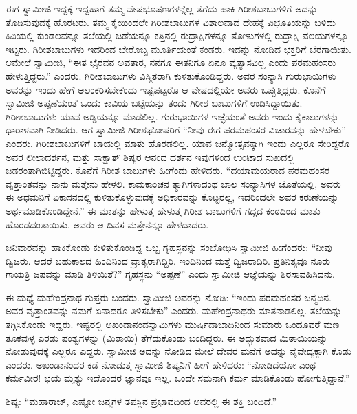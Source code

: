  ಈಗ ಸ್ವಾಮೀಜಿ ಇದ್ದಕ್ಕೆ ಇದ್ದಹಾಗೆ ತಮ್ಮ ವೇಷಭೂಷಣಗಳನ್ನೆಲ್ಲ ತೆಗೆದು ಹಾಕಿ ಗಿರೀಶಬಾಬುಗಳಿಗೆ ಅದನ್ನು ತೊಡಿಸುವುದಕ್ಕೆ ಹೊರಟರು. ತಮ್ಮ ಕೈಯಿಂದಲೇ ಗಿರೀಶಬಾಬುಗಳ ವಿಶಾಲವಾದ ದೇಹಕ್ಕೆ ವಿಭೂತಿಯನ್ನು ಬಳಿದು ಕಿವಿಯಲ್ಲಿ ಕುಂಡಲವನ್ನೂ ತಲೆಯಲ್ಲಿ ಜಡೆಯನ್ನೂ ಕತ್ತಿನಲ್ಲಿ ರುದ್ರಾಕ್ಷಿಗಳನ್ನೂ ತೋಳುಗಳಲ್ಲಿ ರುದ್ರಾಕ್ಷಿ ವಲಯಗಳನ್ನೂ ಇಟ್ಟರು. ಗಿರೀಶಬಾಬುಗಳು ಇದರಿಂದ ಬೇರೊಬ್ಬ ಮೂರ್ತಿಯಂತೆ ಕಂಡರು. ಇದನ್ನು ನೋಡಿದ ಭಕ್ತರಿಗೆ ಬೆರಗಾಯಿತು. ಆಮೇಲೆ ಸ್ವಾಮೀಜಿ, “ಈತ ಭೈರವನ ಅವತಾರ, ನನಗೂ ಈತನಿಗೂ ಏನೂ ವ್ಯತ್ಯಾಸವಿಲ್ಲ ಎಂದು ಪರಮಹಂಸರು ಹೇಳುತ್ತಿದ್ದರು.” ಎಂದರು. ಗಿರೀಶಬಾಬುಗಳು ವಿಸ್ಮಿತರಾಗಿ ಕುಳಿತುಕೊಂಡಿದ್ದರು. ಅವರ ಸಂನ್ಯಾಸಿ ಗುರುಭಾಯಿಗಳು ಅವರನ್ನು ಇಂದು ಹೇಗೆ ಅಲಂಕರಿಸಬೇಕೆಂದು ಇಷ್ಟಪಟ್ಟರೊ ಆ ವೇಷದಲ್ಲಿಯೇ ಅವರು ಒಪ್ಪುತ್ತಿದ್ದರು. ಕೊನೆಗೆ ಸ್ವಾಮೀಜಿ ಅಪ್ಪಣೆಯಂತೆ ಒಂದು ಕಾವಿಯ ಬಟ್ಟೆಯನ್ನು ತಂದು ಗಿರೀಶ ಬಾಬುಗಳಿಗೆ ಉಡಿಸಿದ್ದಾಯಿತು. ಗಿರೀಶಬಾಬುಗಳು ಯಾವ ಅಡ್ಡಿಯನ್ನೂ ಮಾಡಲಿಲ್ಲ. ಗುರುಭಾಯಿಗಳ ಇಚ್ಛೆಯಂತೆ ಅವರು ಇಂದು ಕೈಕಾಲುಗಳನ್ನು ಧಾರಾಳವಾಗಿ ನೀಡಿದರು. ಆಗ ಸ್ವಾಮೀಜಿ ಗಿರೀಶಘೋಷರಿಗೆ “ನೀವು ಈಗ ಪರಮಹಂಸರ ವಿಚಾರವನ್ನು ಹೇಳಬೇಕು” ಎಂದರು. ಗಿರೀಶಬಾಬುಗಳಿಗೆ ಬಾಯಲ್ಲಿ ಮಾತು ಹೊರಡಲಿಲ್ಲ. ಯಾವ ಜನ್ಮೋತ್ಸವಕ್ಕಾಗಿ ಇಂದು ಎಲ್ಲರೂ ಸೇರಿದ್ದರೊ ಅವರ ಲೀಲಾದರ್ಶನ, ಮತ್ತು ಸಾಕ್ಷಾತ್ ಶಿಷ್ಯರ ಆನಂದ ದರ್ಶನ ಇವುಗಳಿಂದ ಉಂಟಾದ ಸುಖದಲ್ಲಿ ಜಡರಂತಾಗಿಬಿಟ್ಟಿದ್ದರು. ಕೊನೆಗೆ ಗಿರೀಶ ಬಾಬುಗಳು ಹೀಗೆಂದು ಹೇಳಿದರು. “ದಯಾಮಯರಾದ ಪರಮಹಂಸರ ವೃತ್ತಾಂತವನ್ನು ನಾನು ಮತ್ತೇನು ಹೇಳಲಿ. ಕಾಮಕಾಂಚನ ತ್ಯಾಗಿಗಳಾದಂಥ ಬಾಲ ಸಂನ್ಯಾಸಿಗಳ ಜೊತೆಯಲ್ಲಿ, ಅವರು ಈ ಅಧಮನಿಗೆ ಏಕಾಸನದಲ್ಲಿ ಕುಳಿತುಕೊಳ್ಳುವುದಕ್ಕೆ ಅಧಿಕಾರವನ್ನು ಕೊಟ್ಟರಲ್ಲ, ಇದರಿಂದಲೇ ಅವರ ಕರುಣೆಯನ್ನು ಅರ್ಥಮಾಡಿಕೊಂಡಿದ್ದೇನೆ.” ಈ ಮಾತನ್ನು ಹೇಳುತ್ತ ಹೇಳುತ್ತ ಗಿರೀಶ ಬಾಬುಗಳಿಗೆ ಗದ್ಗದ ಕಂಠದಿಂದ ಮಾತು ಹೊರಡದಂತಾಯಿತು. ಅವರು ಆ ದಿವಸ ಮತ್ತೇನನ್ನೂ ಹೇಳದಾದರು. 

\vskip 2pt

 ಜನಿವಾರವನ್ನು ಹಾಕಿಕೊಂಡು ಕುಳಿತುಕೊಂಡಿದ್ದ ಒಬ್ಬ ಗೃಹಸ್ಥನನ್ನು ಸಂಬೋಧಿಸಿ ಸ್ವಾಮೀಜಿ ಹೀಗೆಂದರು: “ನೀವು ದ್ವಿಜರು. ಆದರೆ ಬಹುಕಾಲದ ಹಿಂದಿನಿಂದ ವ್ರಾತ್ಯರಾಗಿದ್ದಿರಿ. ಇಂದಿನಿಂದ ಮತ್ತೆ ದ್ವಿಜರಾದಿರಿ. ಪ್ರತಿನಿತ್ಯವೂ ನೂರು ಗಾಯತ್ರಿ ಜಪವನ್ನು ಮಾಡಿ ತಿಳಿಯಿತೆ?” ಗೃಹಸ್ಥನು “ಅಪ್ಪಣೆ” ಎಂದು ಸ್ವಾಮೀಜಿ ಆಜ್ಞೆಯನ್ನು ಶಿರಸಾವಹಿಸಿದನು. 

\vskip 2pt

 ಈ ಮಧ್ಯೆ ಮಹೇಂದ್ರನಾಥ ಗುಪ್ತರು ಬಂದರು. ಸ್ವಾಮೀಜಿ ಅವರನ್ನು ನೋಡಿ: “ಇಂದು ಪರಮಹಂಸರ ಜನ್ಮದಿನ. ಅವರ ವೃತ್ತಾಂತವನ್ನು ನಮಗೆ ಏನಾದರೂ ತಿಳಿಸಬೇಕು” ಎಂದರು. ಮಹೇಂದ್ರನಾಥರು ಮಾತನಾಡಲಿಲ್ಲ. ತಲೆಯನ್ನು ತಗ್ಗಿಸಿಕೊಂಡು ಇದ್ದರು. ಇಷ್ಟರಲ್ಲಿ ಅಖಂಡಾನಂದಸ್ವಾಮಿಗಳು ಮುರ್ಷಿದಾಬಾದಿನಿಂದ ಸುಮಾರು ಒಂದೂವರೆ ಮಣ ತೂಕವುಳ್ಳ ಎರಡು ಪಂತ್ವಗಳನ್ನು (ಮಿಠಾಯಿ) ತೆಗೆದುಕೊಂಡು ಬಂದಿದ್ದರು. ಈ ಅದ್ಭುತವಾದ ಮಿಠಾಯಿಯನ್ನು ನೋಡುವುದಕ್ಕೆ ಎಲ್ಲರೂ ಎದ್ದರು. ಸ್ವಾಮೀಜಿ ಅದನ್ನು ನೋಡಿದ ಮೇಲೆ ದೇವರ ಮನೆಗೆ ಅದನ್ನು ನೈವೇದ್ಯಕ್ಕಾಗಿ ಕೊಡು ಎಂದರು. ಅಖಂಡಾನಂದರ ಕಡೆ ನೋಡುತ್ತ ಸ್ವಾಮೀಜಿ ಶಿಷ್ಯನಿಗೆ ಹೀಗೆ ಹೇಳಿದರು: “ನೋಡಿದೆಯೋ ಎಂಥ ಕರ್ಮವೀರ! ಭಯ ಮೃತ್ಯು ಇದೊಂದರ ಜ್ಞಾನವೂ ಇಲ್ಲ. ಒಂದೇ ಸಮನಾಗಿ ಕರ್ಮ ಮಾಡಿಕೊಂಡು ಹೋಗುತ್ತಿದ್ದಾನೆ.” 

\vskip 2pt

 ಶಿಷ್ಯ: “ಮಹಾರಾಜ್, ಎಷ್ಟೋ ಜನ್ಮಗಳ ತಪಸ್ಸಿನ ಪ್ರಭಾವದಿಂದ ಅವರಲ್ಲಿ ಈ ಶಕ್ತಿ ಬಂದಿದೆ.” 

